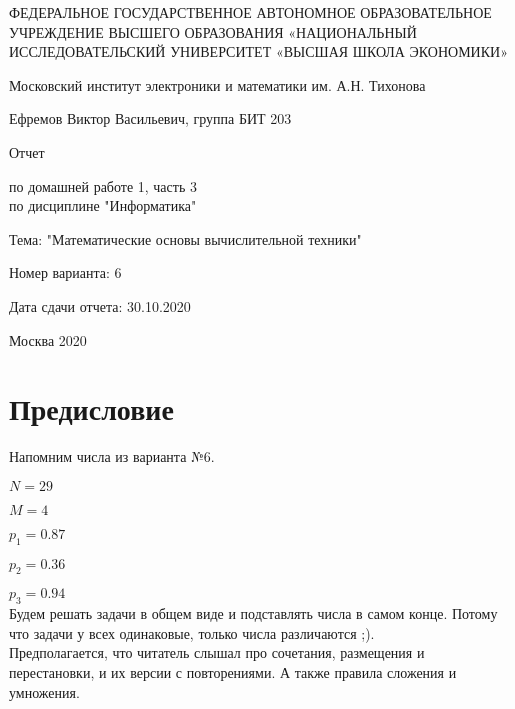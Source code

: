 \documentclass[a4paper,12pt]{article}
\begin{document}
\renewcommand{\arraystretch}{1.5}




\large
\begin{titlepage}
\begin{center}
ФЕДЕРАЛЬНОЕ ГОСУДАРСТВЕННОЕ АВТОНОМНОЕ ОБРАЗОВАТЕЛЬНОЕ УЧРЕЖДЕНИЕ ВЫСШЕГО ОБРАЗОВАНИЯ «НАЦИОНАЛЬНЫЙ ИССЛЕДОВАТЕЛЬСКИЙ УНИВЕРСИТЕТ «ВЫСШАЯ ШКОЛА ЭКОНОМИКИ»

\vspace{1cm}

Московский институт электроники и математики им. А.Н. Тихонова

\vspace{2cm}

Ефремов Виктор Васильевич, группа БИТ 203

\vspace{4cm}

Отчет

по домашней работе 1, часть 3
\\

по дисциплине "Информатика"

Тема: "Математические основы вычислительной техники"

\vspace{1cm}

Номер варианта: 6

Дата сдачи отчета: 30.10.2020

\vfill

Москва
2020
\end{center}
\end{titlepage}
\normalsize




\setcounter{page}{2}

\section*{Предисловие}

Напомним числа из варианта №6.

$N = 29$

$M = 4$

$p_1 = 0.87$

$p_2 = 0.36$

$p_3 = 0.94$
\\

Будем решать задачи в общем виде и подставлять числа в самом конце.
Потому что задачи у всех одинаковые, только числа различаются ;).
\\

Предполагается, что читатель слышал про сочетания, размещения и перестановки, и их версии с повторениями.
А также правила сложения и умножения.
\end{document}
